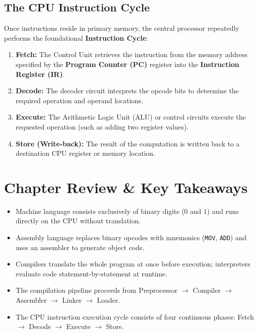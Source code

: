 \subsection{The CPU Instruction Cycle}
Once instructions reside in primary memory, the central processor repeatedly performs the foundational \textbf{Instruction Cycle}:
\begin{enumerate}[leftmargin=1.5em]
    \item \textbf{Fetch:} The Control Unit retrieves the instruction from the memory address specified by the \textbf{Program Counter (PC)} register into the \textbf{Instruction Register (IR)}.
    \item \textbf{Decode:} The decoder circuit interprets the opcode bits to determine the required operation and operand locations.
    \item \textbf{Execute:} The Arithmetic Logic Unit (ALU) or control circuits execute the requested operation (such as adding two register values).
    \item \textbf{Store (Write-back):} The result of the computation is written back to a destination CPU register or memory location.
\end{enumerate}

\section{Chapter Review \& Key Takeaways}
\begin{tcolorbox}[enhanced, colback=boxgreenbg, colframe=boxgreenborder, boxrule=1pt, arc=4pt, title={\bfseries\sffamily Summary Checklist}]
\sffamily\small
\begin{itemize}[leftmargin=1.2em, itemsep=2pt]
    \item Machine language consists exclusively of binary digits ($0$ and $1$) and runs directly on the CPU without translation.
    \item Assembly language replaces binary opcodes with mnemonics (\texttt{MOV}, \texttt{ADD}) and uses an assembler to generate object code.
    \item Compilers translate the whole program at once before execution; interpreters evaluate code statement-by-statement at runtime.
    \item The compilation pipeline proceeds from Preprocessor $\rightarrow$ Compiler $\rightarrow$ Assembler $\rightarrow$ Linker $\rightarrow$ Loader.
    \item The CPU instruction execution cycle consists of four continuous phases: Fetch $\rightarrow$ Decode $\rightarrow$ Execute $\rightarrow$ Store.
\end{itemize}
\end{tcolorbox}
